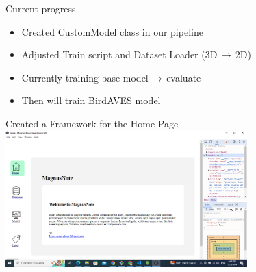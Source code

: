 \begin{frame}{Current progress}
    \begin{itemize}
        \item Created CustomModel class in our pipeline
        \item Adjusted Train script and Dataset Loader (3D$ \,\to\, $2D)
        \item Currently training base model$ \,\to\, $evaluate
        \item Then will train BirdAVES model
    \end{itemize}
\end{frame}


\begin{frame}{Created a Framework for the Home Page}
        \centering
        \includegraphics[height=0.7\textheight,width=0.7\textwidth,keepaspectratio]{images/homepage.png}  
\end{frame}

